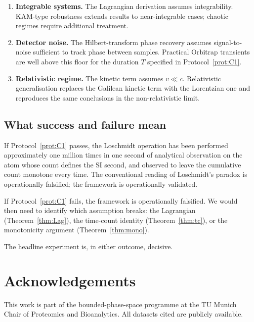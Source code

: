 \documentclass[twocolumn,10pt,a4paper]{article}
\theoremstyle{thmstyle}
\theoremstyle{definition}
\theoremstyle{remark}
\begin{document}
\begin{enumerate}[nosep,leftmargin=*]
\item \textbf{Integrable systems.} The Lagrangian derivation assumes
integrability. KAM-type robustness \citep{kolmogorov1954,arnold1963,moser1962}
extends results to near-integrable cases; chaotic regimes require
additional treatment.
\item \textbf{Detector noise.} The Hilbert-transform phase recovery
assumes signal-to-noise sufficient to track phase between samples.
Practical Orbitrap transients are well above this floor for the
duration $T$ specified in Protocol~\ref{prot:C1}.
\item \textbf{Relativistic regime.} The kinetic term assumes
$v\ll c$. Relativistic generalisation replaces the Galilean kinetic
term with the Lorentzian one and reproduces the same conclusions in
the non-relativistic limit.
\end{enumerate}

\subsection{What success and failure mean}

If Protocol~\ref{prot:C1} passes, the Loschmidt operation has been
performed approximately one million times in one second of analytical
observation on the atom whose count defines the SI second, and
observed to leave the cumulative count monotone every time. The
conventional reading of Loschmidt's paradox is operationally
falsified; the framework is operationally validated.

If Protocol~\ref{prot:C1} fails, the framework is operationally
falsified. We would then need to identify which assumption breaks: the
Lagrangian (Theorem~\ref{thm:Lag}), the time-count identity
(Theorem~\ref{thm:tc}), or the monotonicity argument
(Theorem~\ref{thm:mono}).

The headline experiment is, in either outcome, decisive.

\section*{Acknowledgements}

This work is part of the bounded-phase-space programme at the
TU Munich Chair of Proteomics and Bioanalytics. All datasets cited
are publicly available.



\end{document}
